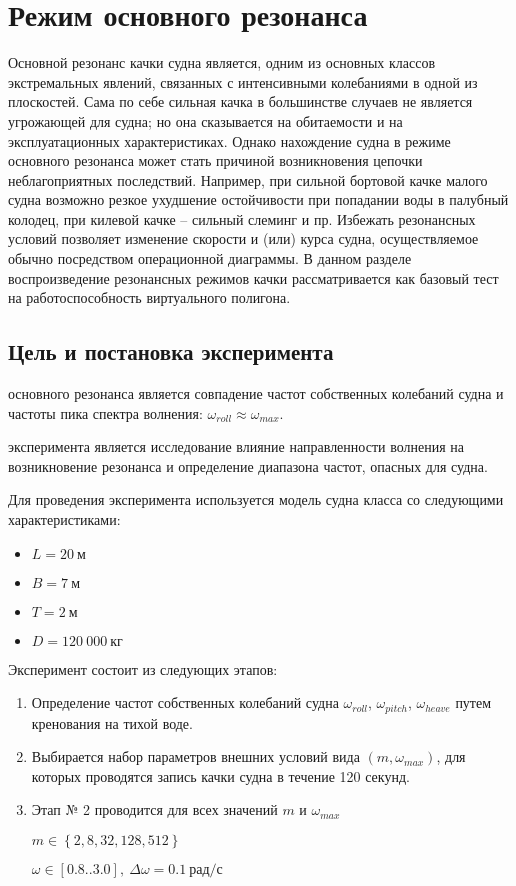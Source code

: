 \section{Режим основного резонанса}

Основной резонанс качки судна является, одним из основных классов экстремальных явлений, связанных с интенсивными колебаниями в одной из плоскостей. Сама по себе сильная качка в большинстве случаев не является угрожающей для судна; но она сказывается на обитаемости и на эксплуатационных характеристиках. Однако нахождение судна в режиме основного резонанса может стать причиной возникновения цепочки неблагоприятных последствий. Например, при сильной бортовой качке малого судна возможно резкое ухудшение остойчивости при попадании воды в палубный колодец, при килевой качке – сильный слеминг и пр. Избежать резонансных условий позволяет изменение скорости и (или) курса судна, осуществляемое обычно посредством операционной диаграммы. В данном разделе воспроизведение резонансных режимов качки рассматривается как базовый тест на работоспособность виртуального полигона.

\subsection{Цель и постановка эксперимента}

 основного резонанса является совпадение частот собственных колебаний судна и частоты пика спектра волнения: $\omega_{roll} \approx \omega_{max}$.

 эксперимента является исследование влияние направленности волнения на возникновение резонанса и определение диапазона частот, опасных для судна.

Для проведения эксперимента используется модель судна класса  со следующими характеристиками:
\begin{itemize}
	\item	$L = 20\ \text{м}$
	\item	$B = 7\ \text{м}$
	\item	$T = 2\ \text{м}$
	\item	$D = 120\ 000\ \text{кг}$
\end{itemize}

Эксперимент состоит из следующих этапов:
\begin{enumerate}
	\item	Определение частот собственных колебаний судна 
			$\omega_{roll}$, $\omega_{pitch}$, $\omega_{heave}$ путем кренования на тихой воде.
	\item	Выбирается набор параметров внешних условий вида $(m, \omega_{max})$, для которых
			проводятся запись качки судна в течение 120 секунд.
	\item	Этап № 2 проводится для всех значений $m$ и $\omega_{max}$
	
			$m \in \left\lbrace 2,8,32,128,512 \right\rbrace$
			
			$\omega \in [0.8..3.0],\ \Delta\omega=0.1\ \text{рад/с}$ 

\end{enumerate}

